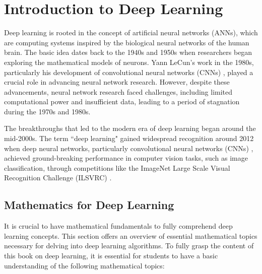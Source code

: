 
\chapter{Introduction to Deep Learning}
Deep learning is rooted in the concept of artificial neural networks (ANNs), which are computing systems inspired by the biological neural networks of the human brain. The basic idea dates back to the 1940s and 1950s when researchers began exploring the mathematical models of neurons. Yann LeCun's work in the 1980s, particularly his development of convolutional neural networks (CNNs)  \cite{lecun1989}, played a crucial role in advancing neural network research. However, despite these advancements, neural network research faced challenges, including limited computational power and insufficient data, leading to a period of stagnation during the 1970s and 1980s.

The breakthroughs that led to the modern era of deep learning began around the mid-2000s. The term ``deep learning" gained widespread recognition around 2012 when deep neural networks, particularly convolutional neural networks (CNNs)  \cite{krizhevsky2012ImageNet}, achieved ground-breaking performance in computer vision tasks, such as image classification, through competitions like the ImageNet Large Scale Visual Recognition Challenge (ILSVRC) \cite{web:ILSVRC}.

\section{Mathematics for Deep Learning}
It is crucial to have mathematical fundamentals to fully comprehend deep learning concepts. This section offers an overview of essential mathematical topics necessary for delving into deep learning algorithms. To fully grasp the content of this book on deep learning, it is essential for students to have a basic understanding of the following mathematical topics:

